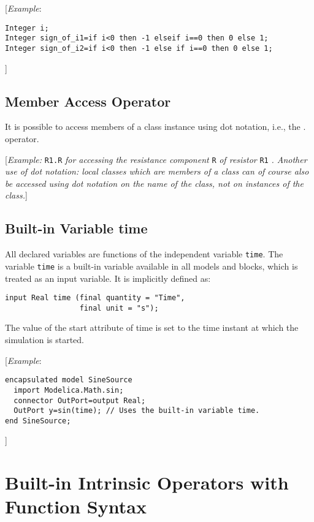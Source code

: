 {[}\emph{Example}:
\begin{lstlisting}[language=modelica]
Integer i;
Integer sign_of_i1=if i<0 then -1 elseif i==0 then 0 else 1;
Integer sign_of_i2=if i<0 then -1 else if i==0 then 0 else 1;
\end{lstlisting}
{]}

\subsection{Member Access Operator}

It is possible to access members of a class instance using dot notation,
i.e., the . operator.

{[}\emph{Example:} \lstinline[basicstyle=\ttfamily]!R1.R! \emph{for accessing the resistance component} \lstinline[basicstyle=\ttfamily]!R!
\emph{of resistor} \lstinline[basicstyle=\ttfamily]!R1! \emph{. Another use of dot notation: local classes
which are members of a class can of course also be accessed using dot
notation on the name of the class, not on instances of the class.}{]}

\subsection{Built-in Variable time}

All declared variables are functions of the independent variable \lstinline[basicstyle=\ttfamily]!time!.
The variable \lstinline[basicstyle=\ttfamily]!time! is a built-in variable available in all models and
blocks, which is treated as an input variable. It is implicitly defined
as:
\begin{lstlisting}[language=modelica]
input Real time (final quantity = "Time",
                 final unit = "s");
\end{lstlisting}

The value of the start attribute of time is set to the time instant at
which the simulation is started.

{[}\emph{Example}:
\begin{lstlisting}[language=modelica]
encapsulated model SineSource
  import Modelica.Math.sin;
  connector OutPort=output Real;
  OutPort y=sin(time); // Uses the built-in variable time.
end SineSource;
\end{lstlisting}
{]}

\section{Built-in Intrinsic Operators with Function Syntax}

